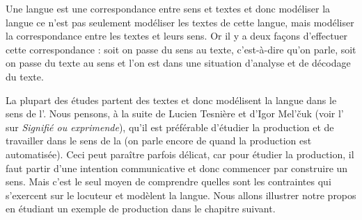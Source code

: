 Une langue est une correspondance entre sens et textes et donc modéliser la langue ce n’est pas seulement modéliser les textes de cette langue, mais modéliser la correspondance entre les textes et leurs sens. Or il y a deux façons d’effectuer cette correspondance : soit on passe du sens au texte, c’est-à-dire qu’on parle, soit on passe du texte au sens et l’on est dans une situation d’analyse et de décodage du texte.

La plupart des études partent des textes et donc modélisent la langue dans le sens de l’. Nous pensons, à la suite de Lucien Tesnière et d’Igor Mel’čuk (voir l' sur \textit{Signifié ou exprimende}), qu’il est préférable d’étudier la production et de travailler dans le sens de la  (on parle encore de  quand la production est automatisée). Ceci peut paraître parfois délicat, car pour étudier la production, il faut partir d’une intention communicative et donc commencer par construire un sens. Mais c’est le seul moyen de comprendre quelles sont les contraintes qui s’exercent sur le locuteur et modèlent la langue. Nous allons illustrer notre propos en étudiant un exemple de production dans le chapitre suivant.

